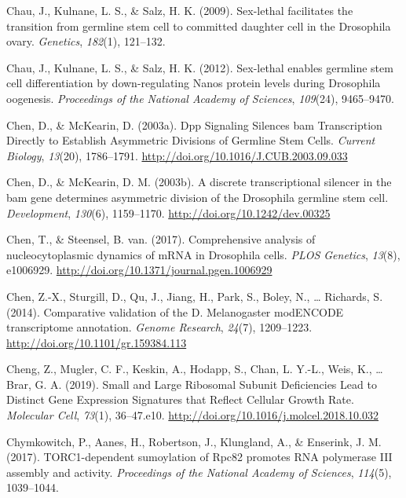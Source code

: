 \documentclass[12pt,twoside]{reedthesis}
\newlength{\cslhangindent}
\newenvironment{cslreferences}%
  {\setlength{\parindent}{0pt}%
  \everypar{\setlength{\hangindent}{\cslhangindent}}\ignorespaces}%
  {\par}
\begin{document}
\begin{cslreferences}
\leavevmode\hypertarget{ref-Chau2009}{}%
Chau, J., Kulnane, L. S., \& Salz, H. K. (2009). Sex-lethal facilitates the transition from germline stem cell to committed daughter cell in the Drosophila ovary. \emph{Genetics}, \emph{182}(1), 121--132.

\leavevmode\hypertarget{ref-Chau2012}{}%
Chau, J., Kulnane, L. S., \& Salz, H. K. (2012). Sex-lethal enables germline stem cell differentiation by down-regulating Nanos protein levels during Drosophila oogenesis. \emph{Proceedings of the National Academy of Sciences}, \emph{109}(24), 9465--9470.

\leavevmode\hypertarget{ref-Chen2003o}{}%
Chen, D., \& McKearin, D. (2003a). Dpp Signaling Silences bam Transcription Directly to Establish Asymmetric Divisions of Germline Stem Cells. \emph{Current Biology}, \emph{13}(20), 1786--1791. \url{http://doi.org/10.1016/J.CUB.2003.09.033}

\leavevmode\hypertarget{ref-Chen2003q}{}%
Chen, D., \& McKearin, D. M. (2003b). A discrete transcriptional silencer in the bam gene determines asymmetric division of the Drosophila germline stem cell. \emph{Development}, \emph{130}(6), 1159--1170. \url{http://doi.org/10.1242/dev.00325}

\leavevmode\hypertarget{ref-chenComprehensiveAnalysisNucleocytoplasmic2017}{}%
Chen, T., \& Steensel, B. van. (2017). Comprehensive analysis of nucleocytoplasmic dynamics of mRNA in Drosophila cells. \emph{PLOS Genetics}, \emph{13}(8), e1006929. \url{http://doi.org/10.1371/journal.pgen.1006929}

\leavevmode\hypertarget{ref-chenComparativeValidationMelanogaster2014}{}%
Chen, Z.-X., Sturgill, D., Qu, J., Jiang, H., Park, S., Boley, N., \ldots{} Richards, S. (2014). Comparative validation of the D. Melanogaster modENCODE transcriptome annotation. \emph{Genome Research}, \emph{24}(7), 1209--1223. \url{http://doi.org/10.1101/gr.159384.113}

\leavevmode\hypertarget{ref-chengSmallLargeRibosomal2019}{}%
Cheng, Z., Mugler, C. F., Keskin, A., Hodapp, S., Chan, L. Y.-L., Weis, K., \ldots{} Brar, G. A. (2019). Small and Large Ribosomal Subunit Deficiencies Lead to Distinct Gene Expression Signatures that Reflect Cellular Growth Rate. \emph{Molecular Cell}, \emph{73}(1), 36--47.e10. \url{http://doi.org/10.1016/j.molcel.2018.10.032}

\leavevmode\hypertarget{ref-Chymkowitch2017a}{}%
Chymkowitch, P., Aanes, H., Robertson, J., Klungland, A., \& Enserink, J. M. (2017). TORC1-dependent sumoylation of Rpc82 promotes RNA polymerase III assembly and activity. \emph{Proceedings of the National Academy of Sciences}, \emph{114}(5), 1039--1044.


\end{cslreferences}
\end{document}
